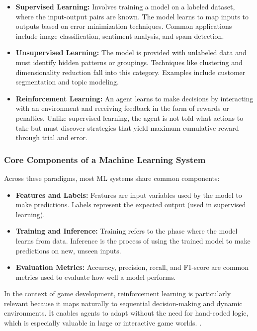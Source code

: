 \documentclass[12pt,oneside,openright,a4paper]{cpe-english-project}
\begin{document}
\begin{itemize}
\item \textbf{Supervised Learning:} Involves training a model on a labeled dataset, where the input-output pairs are known. The model learns to map inputs to outputs based on error minimization techniques. Common applications include image classification, sentiment analysis, and spam detection.
\item \textbf{Unsupervised Learning:} The model is provided with unlabeled data and must identify hidden patterns or groupings. Techniques like clustering and dimensionality reduction fall into this category. Examples include customer segmentation and topic modeling.
\item \textbf{Reinforcement Learning:} An agent learns to make decisions by interacting with an environment and receiving feedback in the form of rewards or penalties. Unlike supervised learning, the agent is not told what actions to take but must discover strategies that yield maximum cumulative reward through trial and error.
\end{itemize}

\subsubsection{Core Components of a Machine Learning System}

Across these paradigms, most ML systems share common components:
\begin{itemize}
\item \textbf{Features and Labels:} Features are input variables used by the model to make predictions. Labels represent the expected output (used in supervised learning).
\item \textbf{Training and Inference:} Training refers to the phase where the model learns from data. Inference is the process of using the trained model to make predictions on new, unseen inputs.
\item \textbf{Evaluation Metrics:} Accuracy, precision, recall, and F1-score are common metrics used to evaluate how well a model performs.
\end{itemize}

In the context of game development, reinforcement learning is particularly relevant because it maps naturally to sequential decision-making and dynamic environments. It enables agents to adapt without the need for hand-coded logic, which is especially valuable in large or interactive game worlds. \cite{sutton2018reinforcement}.
\end{document}
